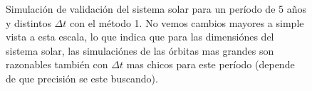 \begin{figure}
{	\label{fig:ej2_m1_1825_12}
	}
	\caption{
		Simulación de validación del sistema solar para un período de 5 años y distintos $\Delta t$
		con el método 1.
		No vemos cambios mayores a simple vista a esta escala,
		lo que indica que para las dimensiónes del sistema solar,
		las simulaciónes de las órbitas mas grandes son razonables también con $\Delta t$ mas chicos para este período
		(depende de que precisión se este buscando).
	}
	\label{ fig:res_ej2_m1_1825 }
\end{figure}
